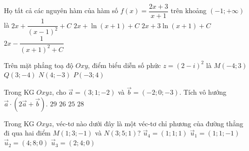 \begin{ex}%
Họ tất cả các nguyên hàm của hàm số $f(x)=\dfrac{2x+3}{x+1}$ trên khoảng $(-1;+\infty)$ là	
	\choice
	{$2x+\dfrac{1}{(x-1)^2}+C$}
	{\True $2x+\ln (x+1)+C$}
	{$2x+3\ln (x+1)+C$}
	{$2x-\dfrac{1}{(x+1)^2+C}$}
\end{ex}

\begin{ex}%
	Trên mặt phẳng toạ độ $Oxy$, điểm biểu diễn số phức $z=(2-i)^2$  là
	\choice
	{$M(-4;3)$}
	{\True $Q(3;-4)$}
	{$N(4;-3)$}
	{$P(-3;4)$}
\end{ex}

\begin{ex}%
	Trong KG $Oxyz$, cho $\overrightarrow{a}=(3;1;-2)$ và $\overrightarrow{b}=(-2;0;-3)$. Tích vô hướng $\overrightarrow{a}\cdot \left( 2\overrightarrow{a}+\overrightarrow{b}\right) $.
	\choice
	{$29$}
	{$26$}
	{$25$}
	{\True $28$}
\end{ex}

\begin{ex}%
	Trong KG $Oxyz$, véc-tơ nào dưới đây là một véc-tơ chỉ phương của đường thẳng đi qua hai điểm $M(1;3;-1)$ và $N(3;5;1)$?
	\choice
	{\True $\overrightarrow{u}_4=(1;1;1)$}
	{$\overrightarrow{u}_1=(1;1;-1)$}
	{$\overrightarrow{u}_2=(4;8;0)$}
	{$\overrightarrow{u}_3=(2;4;0)$}
\end{ex}

